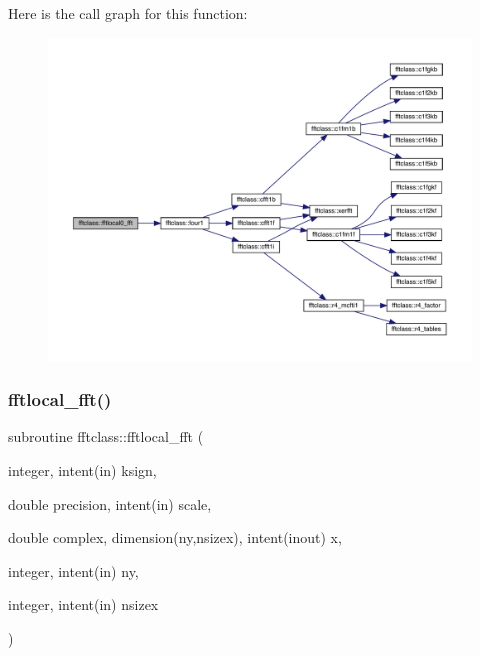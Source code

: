 Here is the call graph for this function\+:\nopagebreak
\begin{figure}[H]
\begin{center}
\leavevmode
\includegraphics[width=350pt]{namespacefftclass_a501325267c1425bfece04a18e20efe31_cgraph}
\end{center}
\end{figure}
\mbox{\label{namespacefftclass_aa64d94b8c8578b384955207a409a2445}} 
\subsubsection{\texorpdfstring{fftlocal\_fft()}{fftlocal\_fft()}}
{\footnotesize\ttfamily subroutine fftclass\+::fftlocal\+\_\+fft (\begin{DoxyParamCaption}\item[{integer, intent(in)}]{ksign,  }\item[{double precision, intent(in)}]{scale,  }\item[{double complex, dimension(ny,nsizex), intent(inout)}]{x,  }\item[{integer, intent(in)}]{ny,  }\item[{integer, intent(in)}]{nsizex }\end{DoxyParamCaption})}

